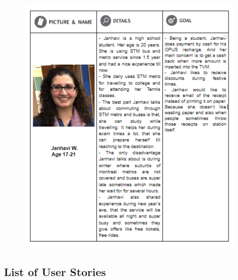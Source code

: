 \documentclass[12pt]{report}
\begin{document}
\begin{figure}[h!]
\begin{center}
  \includegraphics[width=11.5cm, height=13cm]{Images/Persona_Ashutosh.png}
  \end{center}
\end{figure}

\newpage
\subsection{List of User Stories}
\end{document}

